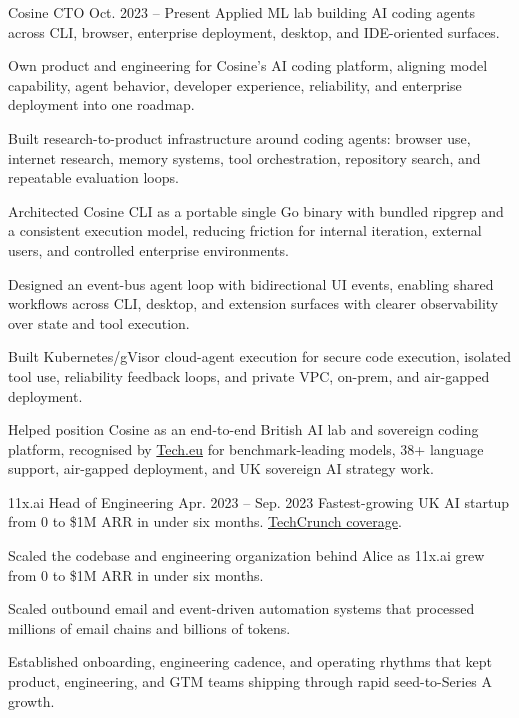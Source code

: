 
\ResumeJob
  {Cosine}
  {CTO}
  {Oct. 2023 -- Present}
  {Applied ML lab building AI coding agents across CLI, browser, enterprise deployment, desktop, and IDE-oriented surfaces.}
\begin{ResumeList}
  \item Own product and engineering for Cosine's AI coding platform, aligning model capability, agent behavior, developer experience, reliability, and enterprise deployment into one roadmap.
  \item Built research-to-product infrastructure around coding agents: browser use, internet research, memory systems, tool orchestration, repository search, and repeatable evaluation loops.
  \item Architected Cosine CLI as a portable single Go binary with bundled ripgrep and a consistent execution model, reducing friction for internal iteration, external users, and controlled enterprise environments.
  \item Designed an event-bus agent loop with bidirectional UI events, enabling shared workflows across CLI, desktop, and extension surfaces with clearer observability over state and tool execution.
  \item Built Kubernetes/gVisor cloud-agent execution for secure code execution, isolated tool use, reliability feedback loops, and private VPC, on-prem, and air-gapped deployment.
  \item Helped position Cosine as an end-to-end British AI lab and sovereign coding platform, recognised by \href{https://tech.eu/2026/04/17/cosine-goes-from-benchmark-leader-to-cornerstone-of-uk-sovereign-ai-strategy/}{Tech.eu} for benchmark-leading models, 38+ language support, air-gapped deployment, and UK sovereign AI strategy work.
\end{ResumeList}

\ResumeJob
  {11x.ai}
  {Head of Engineering}
  {Apr. 2023 -- Sep. 2023}
  {Fastest-growing UK AI startup from 0 to \$1M ARR in under six months. \href{https://techcrunch.com/2023/08/11/11xai-closes-2-million-pre-seed-to-create-autonomous-ai-workers/}{TechCrunch coverage}.}
\begin{ResumeList}
  \item Scaled the codebase and engineering organization behind Alice as 11x.ai grew from 0 to \$1M ARR in under six months.
  \item Scaled outbound email and event-driven automation systems that processed millions of email chains and billions of tokens.
  \item Established onboarding, engineering cadence, and operating rhythms that kept product, engineering, and GTM teams shipping through rapid seed-to-Series A growth.
\end{ResumeList}

